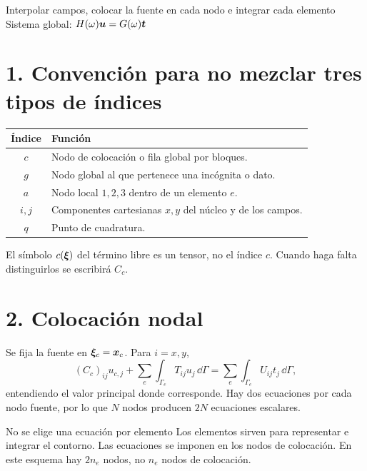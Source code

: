 \documentclass[11pt]{article}
\begin{document}
\base
{}
{Interpolar campos, colocar la fuente en cada nodo e integrar cada elemento}
{Sistema global: \(H(\omega)\bm{u}=G(\omega)\bm{t}\)}

\section*{1. Convención para no mezclar tres tipos de índices}
\begin{center}
\begin{tabular}{cl}
\toprule
Índice & Función\\
\midrule
\(c\) & Nodo de colocación o fila global por bloques.\\
\(g\) & Nodo global al que pertenece una incógnita o dato.\\
\(a\) & Nodo local \(1,2,3\) dentro de un elemento \(e\).\\
\(i,j\) & Componentes cartesianas \(x,y\) del núcleo y de los campos.\\
\(q\) & Punto de cuadratura.\\
\bottomrule
\end{tabular}
\end{center}
El símbolo \(c(\bm{\xi})\) del término libre es un tensor, no el índice
\(c\). Cuando haga falta distinguirlos se escribirá \(C_c\).

\section*{2. Colocación nodal}
Se fija la fuente en \(\bm{\xi}_c=\bm{x}_c\). Para \(i=x,y\),
\[
 (C_c)_{ij}u_{c,j}+
 \sum_e\int_{\Gamma_e}T_{ij}u_j\,\dd\Gamma
 =\sum_e\int_{\Gamma_e}U_{ij}t_j\,\dd\Gamma,
\]
entendiendo el valor principal donde corresponde.
Hay dos ecuaciones por cada nodo fuente, por lo que \(N\) nodos producen
\(2N\) ecuaciones escalares.

\begin{idea}{No se elige una ecuación por elemento}
Los elementos sirven para representar e integrar el contorno. Las ecuaciones
se imponen en los nodos de colocación. En este esquema hay \(2n_e\) nodos,
no \(n_e\) nodos de colocación.
\end{idea}
\end{document}
